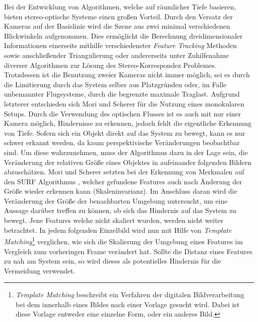 \noindent
Bei der Entwicklung von Algorithmen, welche auf räumlicher Tiefe basieren, bieten stereo-optische Systeme einen großen Vorteil. Durch den Versatz der Kameras auf der Basislinie wird die Szene aus zwei minimal verschiedenen Blickwinkeln aufgenommen. Dies ermöglicht die Berechnung dreidimensionaler Informationen einerseits mithilfe verschiedenster \emph{Feature Tracking} Methoden sowie anschließender Triangulierung oder andererseits unter Zuhilfenahme diverser Algorithmen zur Lösung des Stereo-Korrespondez Problemes. Trotzdessen ist die Benutzung zweier Kameras nicht immer möglich, sei es durch die Limitierung durch das System selber aus Platzgründen oder, im Falle unbemannter Flugsysteme, durch die begrenzte maximale Traglast. Aufgrund letzterer entschieden sich Mori und Scherer \cite{mori2013first} für die Nutzung eines monokularen Setups. Durch die Verwendung des optischen Flusses ist es auch mit nur einer Kamera möglich, Hindernisse zu erkennen, jedoch fehlt die eigentliche Erkennung von Tiefe. Sofern sich ein Objekt direkt auf das System zu bewegt, kann es nur schwer erkannt werden, da kaum perspektivische Veränderungen beobachtbar sind. Um diese wahrzunehmen, muss der Algorithmus dazu in der Lage sein, die Veränderung der relativen Größe eines Objektes in aufeinander folgenden Bildern abzuschätzen. Mori und Scherer setzten bei der Erkennung von Merkmalen auf den SURF Algorithmus \cite{bay2006surf}, welcher gefundene Features auch nach Änderung der Größe wieder erkennen kann (Skaleninvarianz). Im Anschluss daran wird die Veränderung der Größe der benachbarten Umgebung untersucht, um eine Aussage darüber treffen zu können, ob sich das Hindernis auf das System zu bewegt. Jene Features welche nicht skaliert wurden, werden nicht weiter betrachtet. In jedem folgenden Einzelbild wird nun mit Hilfe von \emph{Template Matching}\footnote{\emph{Template Matching} beschreibt ein Verfahren der digitalen Bildverarbeitung bei dem innerhalb eines Bildes nach einer Vorlage gesucht wird. Dabei ist diese Vorlage entweder eine einzelne Form, oder ein anderes Bild.} verglichen, wie sich die Skalierung der Umgebung eines Features im Vergleich zum vorheringen Frame verändert hat. Sollte die Distanz eines Features zu nah am System sein, so wird dieses als potentielles Hindernis für die Vermeidung verwendet.